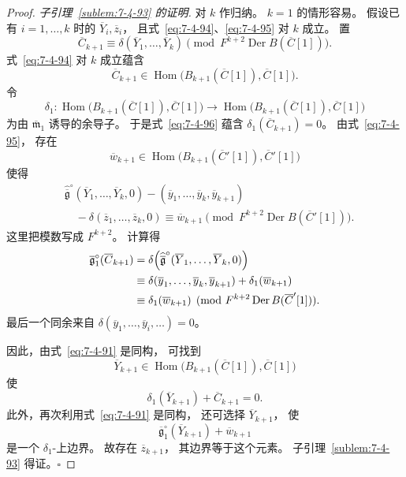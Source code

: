 \begin{proof}
\par\noindent\textit{子引理~\ref{sublem:7-4-93} 的证明.}\quad
对 $k$ 作归纳。
$k=1$ 的情形容易。
假设已有 $i=1,\ldots,k$ 时的
$\overline Y_i,\overline z_i$，
且式~\eqref{eq:7-4-94}、\eqref{eq:7-4-95}
对 $k$ 成立。
置
\begin{equation}
\overline C_{k+1}
\equiv
\delta(\overline Y_1,\ldots,\overline Y_k)
\pmod{F^{k+2}\operatorname{Der}B(\overline C[1])}.
\tag{7.4.96}\label{eq:7-4-96}
\end{equation}
式~\eqref{eq:7-4-94} 对 $k$ 成立蕴含
\[
\overline C_{k+1}\in
\operatorname{Hom}\bigl(
B_{k+1}(\overline C[1]),
\overline C[1]
\bigr).
\]
令
\[
\delta_1:
\operatorname{Hom}\bigl(
B_{k+1}(\overline C[1]),
\overline C[1]
\bigr)
\longrightarrow
\operatorname{Hom}\bigl(
B_{k+1}(\overline C[1]),
\overline C[1]
\bigr)
\]
为由 $\overline{\mathfrak m}_1$ 诱导的余导子。
于是式~\eqref{eq:7-4-96} 蕴含
$\delta_1(\overline C_{k+1})=0$。
由式~\eqref{eq:7-4-95}，
存在
\[
\overline w_{k+1}\in
\operatorname{Hom}\bigl(
B_{k+1}(\overline C'[1]),
\overline C'[1]
\bigr)
\]
使得
\[
\begin{aligned}
&\widehat{\overline{\mathfrak g}}^{\circ}
(\overline Y_1,\ldots,\overline Y_k,0)
-(\overline y_1,\ldots,\overline y_k,\overline y_{k+1})\\
&\quad
-\delta(\overline z_1,\ldots,\overline z_k,0)
\equiv\overline w_{k+1}
\pmod{F^{k+2}\operatorname{Der}B(\overline C'[1])}.
\end{aligned}
\]
这里把模数写成 $F^{k+2}$。
计算得
\[
\begin{aligned}
\overline{\mathfrak g}^{\circ}_1(\overline C_{k+1})
&=
\delta\Bigl(
\widehat{\overline{\mathfrak g}}^{\circ}
(\overline Y_1,\ldots,\overline Y_k,0)
\Bigr)\\
&\equiv
\delta(\overline y_1,\ldots,\overline y_k,\overline y_{k+1})
+\delta_1(\overline w_{k+1})\\
&\equiv
\delta_1(\overline w_{k+1})
\pmod{F^{k+2}\operatorname{Der}B(\overline C'[1])}.
\end{aligned}
\]
最后一个同余来自
$\delta(\overline y_1,\ldots,\overline y_i,\ldots)=0$。

因此，由式~\eqref{eq:7-4-91} 是同构，
可找到
\[
\overline Y_{k+1}\in
\operatorname{Hom}\bigl(
B_{k+1}(\overline C[1]),
\overline C[1]
\bigr)
\]
使
\[
\delta_1(\overline Y_{k+1})+\overline C_{k+1}=0.
\]
此外，再次利用式~\eqref{eq:7-4-91} 是同构，
还可选择 $\overline Y_{k+1}$，
使
\[
\overline{\mathfrak g}^{\circ}_1(\overline Y_{k+1})
+\overline w_{k+1}
\]
是一个 $\delta_1$-上边界。
故存在 $\overline z_{k+1}$，
其边界等于这个元素。
子引理~\ref{sublem:7-4-93} 得证。\hfill$\square$


\end{proof}
